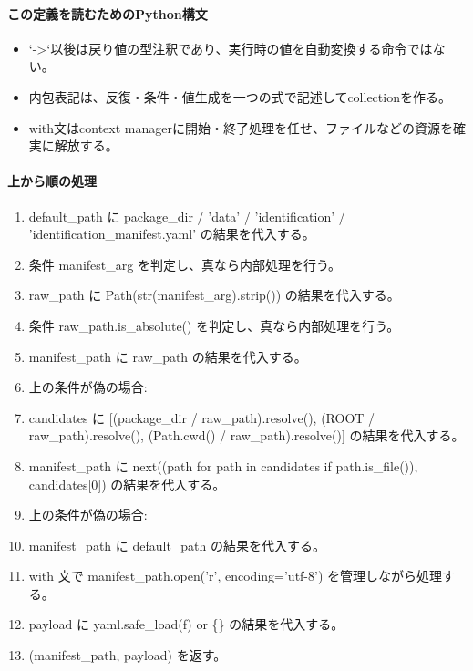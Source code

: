 \documentclass[a4paper,11pt]{article}
\begin{document}
            \paragraph{この定義を読むためのPython構文}
            \begin{itemize}[leftmargin=1.6em]
            \item `->`以後は戻り値の型注釈であり、実行時の値を自動変換する命令ではない。
\item 内包表記は、反復・条件・値生成を一つの式で記述してcollectionを作る。
\item with文はcontext managerに開始・終了処理を任せ、ファイルなどの資源を確実に解放する。
            \end{itemize}
            \paragraph{上から順の処理}
            \begin{enumerate}[leftmargin=1.8em]
            \item default\_path に package\_dir / 'data' / 'identification' / 'identification\_manifest.yaml' の結果を代入する。
\item 条件 manifest\_arg を判定し、真なら内部処理を行う。
\item   raw\_path に Path(str(manifest\_arg).strip()) の結果を代入する。
\item   条件 raw\_path.is\_absolute() を判定し、真なら内部処理を行う。
\item     manifest\_path に raw\_path の結果を代入する。
\item     上の条件が偽の場合:
\item     candidates に [(package\_dir / raw\_path).resolve(), (ROOT / raw\_path).resolve(), (Path.cwd() / raw\_path).resolve()] の結果を代入する。
\item     manifest\_path に next((path for path in candidates if path.is\_file()), candidates[0]) の結果を代入する。
\item   上の条件が偽の場合:
\item   manifest\_path に default\_path の結果を代入する。
\item with 文で manifest\_path.open('r', encoding='utf-8') を管理しながら処理する。
\item   payload に yaml.safe\_load(f) or \{\} の結果を代入する。
\item (manifest\_path, payload) を返す。
            \end{enumerate}
\end{document}
